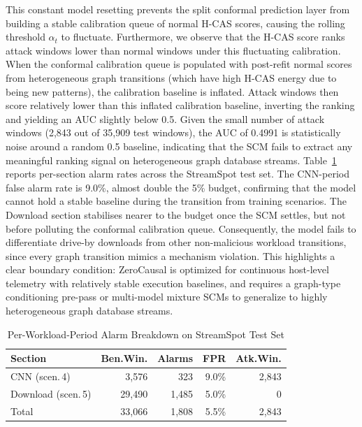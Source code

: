 This constant model resetting prevents the split conformal prediction layer from building a stable calibration queue of normal H-CAS scores, causing the rolling threshold $\alpha_t$ to fluctuate. Furthermore, we observe that the H-CAS score ranks attack windows lower than normal windows under this fluctuating calibration. When the conformal calibration queue is populated with post-refit normal scores from heterogeneous graph transitions (which have high H-CAS energy due to being new patterns), the calibration baseline is inflated. Attack windows then score relatively lower than this inflated calibration baseline, inverting the ranking and yielding an AUC slightly below 0.5. Given the small number of attack windows (2,843 out of 35,909 test windows), the AUC of 0.4991 is statistically noise around a random 0.5 baseline, indicating that the SCM fails to extract any meaningful ranking signal on heterogeneous graph database streams. Table~\ref{tab:streamspot_workload} reports per-section alarm rates across the StreamSpot test set. The CNN-period false alarm rate is 9.0\%, almost double the 5\% budget, confirming that the model cannot hold a stable baseline during the transition from training scenarios. The Download section stabilises nearer to the budget once the SCM settles, but not before polluting the conformal calibration queue. Consequently, the model fails to differentiate drive-by downloads from other non-malicious workload transitions, since every graph transition mimics a mechanism violation. This highlights a clear boundary condition: ZeroCausal is optimized for continuous host-level telemetry with relatively stable execution baselines, and requires a graph-type conditioning pre-pass or multi-model mixture SCMs to generalize to highly heterogeneous graph database streams.

\begin{table}[htbp]
\centering
\caption{Per-Workload-Period Alarm Breakdown on StreamSpot Test Set}
\begin{tabular}{lrrrr}
\toprule
Section & Ben.Win. & Alarms & FPR & Atk.Win. \\
\midrule
CNN (scen.\,4) & 3,576 & 323 & 9.0\% & 2,843 \\
Download (scen.\,5) & 29,490 & 1,485 & 5.0\% & 0 \\
\midrule
Total & 33,066 & 1,808 & 5.5\% & 2,843 \\
\bottomrule
\end{tabular}
\par{}
\label{tab:streamspot_workload}
\end{table}

